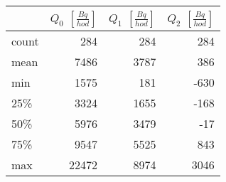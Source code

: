 \begin{tabular}{lrrr}
\toprule
{} &  $Q_0$ $\left[\si{\frac{Bq}{hod}}\right]$ &  $Q_1$ $\left[\si{\frac{Bq}{hod}}\right]$ &  $Q_2$ $\left[\si{\frac{Bq}{hod}}\right]$ \\
\midrule
count &                                       284 &                                       284 &                                       284 \\
mean  &                                      7486 &                                      3787 &                                       386 \\
min   &                                      1575 &                                       181 &                                      -630 \\
25\%   &                                      3324 &                                      1655 &                                      -168 \\
50\%   &                                      5976 &                                      3479 &                                       -17 \\
75\%   &                                      9547 &                                      5525 &                                       843 \\
max   &                                     22472 &                                      8974 &                                      3046 \\
\bottomrule
\end{tabular}
